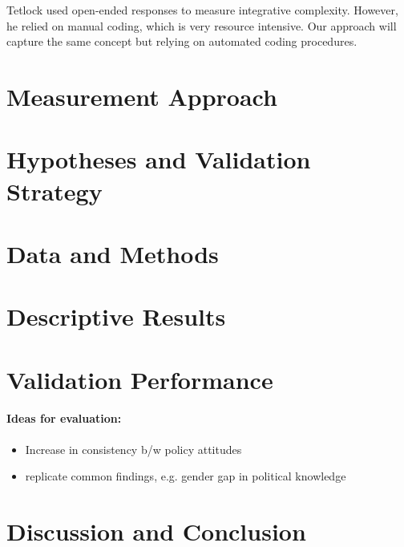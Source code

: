 \documentclass[12pt]{article}
\begin{document}
Tetlock used open-ended responses to measure integrative complexity. However, he relied on manual coding, which is very resource intensive. Our approach will capture the same concept but relying on automated coding procedures.




\section{Measurement Approach}



\section{Hypotheses and Validation Strategy}


\section{Data and Methods}

\section{Descriptive Results}

\section{Validation Performance}

\paragraph{Ideas for evaluation:}
\begin{itemize}\singlespacing
\item Increase in consistency b/w policy attitudes \citep[e.g.][]{prior2014visual}
\item replicate common findings, e.g. gender gap in political knowledge \citep[e.g.][]{barabas2014question}
\end{itemize}

\section{Discussion and Conclusion}


\clearpage


\end{document}
